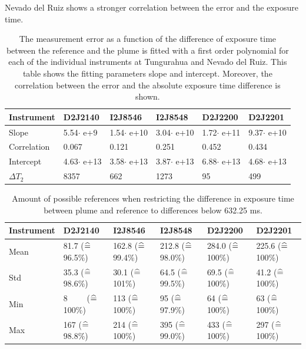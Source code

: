 Nevado del Ruiz shows a stronger correlation between the   error and the exposure time.
\begin{table}[h]
	\centering
	\begin{tabular}{|p{2cm}|p{2cm}|p{2cm}|p{2cm}|p{2cm}|p{2cm}|}
		Instrument	&D2J2140&I2J8546& I2J8548&D2J2200&D2J2201\\
		\toprule
		Slope& 5.54$\cdot$ e+9&1.54$\cdot$ e+10 &3.04$\cdot$ e+10&1.72$\cdot$ e+11&9.37$\cdot$ e+10\\
		\midrule
		Correlation&0.067
		&0.121&
		0.251&
		0.452&
		0.434\\
		\midrule
		Intercept&4.63$\cdot$ e+13&3.58$\cdot$ e+13& 3.87$\cdot$ e+13& 6.88$\cdot$ e+13& 4.68$\cdot$ e+13\\
		\midrule
		$\Delta T_{2}$&8357&662&1273&95&499\\
		\bottomrule
	\end{tabular}
	\caption{The  measurement error as a function of the difference of exposure time between the reference and the plume is fitted with a first order polynomial for each of the individual instruments at Tungurahua and Nevado del Ruiz. This table shows the fitting parameters slope and intercept. Moreover, the correlation between the  error and the absolute exposure time difference is shown.}
	\label{tab:exptimecalc}
\end{table}

\begin{table}
	\centering
	\begin{tabular}{|p{1.8cm}|p{2.15cm}|p{2.15cm}|p{2.15cm}|p{2.15cm}|p{2.15cm}|}
		Instrument	&D2J2140&I2J8546& I2J8548&D2J2200&D2J2201\\
		\toprule
		Mean&
		81.7 ($\mathrel{\widehat{=}}\,$96.5\%)		&162.8 ($\mathrel{\widehat{=}}\,$99.4\%)		&212.8 ($\mathrel{\widehat{=}}\,$98.0\%)		&284.0 ($\mathrel{\widehat{=}}\,$100\%)		&225.6 ($\mathrel{\widehat{=}}\,$100\%) \\
		\midrule
		Std&
		35.3 ($\mathrel{\widehat{=}}\,$98.6\%)&		30.1 ($\mathrel{\widehat{=}}\,$101\%)&
		64.5 ($\mathrel{\widehat{=}}\,$99.5\%) &		69.5 ($\mathrel{\widehat{=}}\,$100\%) &
		41.2 ($\mathrel{\widehat{=}}\,$100\%) \\
		\midrule
		Min  &
		8 $\qquad$($\mathrel{\widehat{=}}\,$100\%)&113 ($\mathrel{\widehat{=}}\,$100\%)
		&95 ($\mathrel{\widehat{=}}\,$97.9\%)
		&64 ($\mathrel{\widehat{=}}\,$100\%)
		&63 ($\mathrel{\widehat{=}}\,$100\%)\\
		\midrule
		Max&
		167 ($\mathrel{\widehat{=}}\,$98.8\%) &
		214 ($\mathrel{\widehat{=}}\,$100\%) &
		395 ($\mathrel{\widehat{=}}\,$99.0\%) &
		433 ($\mathrel{\widehat{=}}\,$100\%)  &
		297 ($\mathrel{\widehat{=}}\,$100\%) \\
		\bottomrule
	\end{tabular}
	\caption{Amount of possible references when restricting the difference in exposure time  between plume and reference to differences below 632.25 ms.}
	\label{tab:etrest}
\end{table}	


